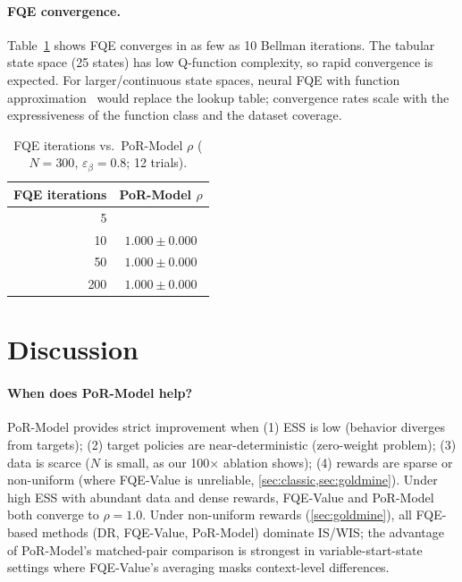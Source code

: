 \documentclass[10pt]{article}
\theoremstyle{plain}
\theoremstyle{definition}
\theoremstyle{remark}
\newcommand{\good}[1]{{\color{goodgreen}\textbf{#1}}}
\newcommand{\med}[1]{{\color{medorange}{#1}}}
\begin{document}
\paragraph{FQE convergence.}
Table~\ref{tab:ablation_fqe} shows FQE converges in as few as 10 Bellman
iterations.  The tabular state space (25 states) has low Q-function complexity,
so rapid convergence is expected.  For larger/continuous state spaces, neural
FQE with function approximation~\citep{le2019batch} would replace the lookup
table; convergence rates scale with the expressiveness of the function class
and the dataset coverage.

\begin{table}[h]
  \centering\small
  \caption{FQE iterations vs.\ PoR-Model $\rho$
    ($N=300$, $\varepsilon_\beta=0.8$; 12 trials).}
  \label{tab:ablation_fqe}
  \begin{tabular}{rc}
    \toprule
    FQE iterations & PoR-Model $\rho$ \\
    \midrule
    5   & \med{$0.800{\pm}0.346$} \\
    10  & \good{$1.000{\pm}0.000$} \\
    50  & \good{$1.000{\pm}0.000$} \\
    200 & \good{$1.000{\pm}0.000$} \\
    \bottomrule
  \end{tabular}
\end{table}

\section{Discussion}
\label{sec:discussion}

\paragraph{When does PoR-Model help?}
PoR-Model provides strict improvement when (1) ESS is low (behavior diverges
from targets); (2) target policies are near-deterministic (zero-weight problem);
(3) data is scarce ($N$ is small, as our 100$\times$ ablation shows); (4)
rewards are sparse or non-uniform (where FQE-Value is unreliable,
\cref{sec:classic,sec:goldmine}).  Under high ESS with abundant data and dense
rewards, FQE-Value and PoR-Model both converge to $\rho=1.0$.
Under non-uniform rewards (\cref{sec:goldmine}), all FQE-based methods
(DR, FQE-Value, PoR-Model) dominate IS/WIS; the advantage of PoR-Model's
matched-pair comparison is strongest in variable-start-state settings
where FQE-Value's averaging masks context-level differences.
\end{document}
